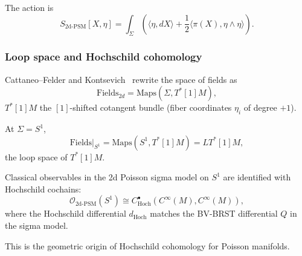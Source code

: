 The action is
\begin{equation}
\label{eq:2d_PSM_action}
S_{\text{2d-PSM}}[X, \eta] = \int_\Sigma \left( \langle \eta, dX \rangle + \frac{1}{2} \langle \pi(X), \eta \wedge \eta \rangle \right).
\end{equation}
\subsubsection{Loop space and Hochschild cohomology}
Cattaneo--Felder and Kontsevich~\cite{Kon03} rewrite the space of fields as
\begin{equation}
\text{Fields}_{2d} = \text{Maps}(\Sigma, T^*[1]M),
\end{equation}
$T^*[1]M$ the $[1]$-shifted cotangent bundle (fiber coordinates $\eta_i$ of degree $+1$).

At $\Sigma = S^1$,
\begin{equation}
\text{Fields}|_{S^1} = \text{Maps}(S^1, T^*[1]M) = LT^*[1]M,
\end{equation}
the loop space of $T^*[1]M$.
\begin{theorem}
\label{thm:2d_PSM_Hochschild}
Classical observables in the 2d Poisson sigma model on $S^1$ are identified with Hochschild cochains:
\begin{equation}
\mathcal{O}_{\text{2d-PSM}}(S^1) \cong C^\bullet_{\text{Hoch}}(C^\infty(M), C^\infty(M)),
\end{equation}
where the Hochschild differential $d_{\text{Hoch}}$ matches the BV-BRST differential $Q$ in the sigma model.
\end{theorem}

This is the geometric origin of Hochschild cohomology for Poisson manifolds.
